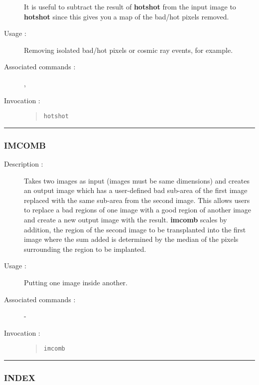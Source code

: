 \begin{description}
\begin{enumerate}
\end{enumerate}

It is useful to subtract the result of {\bf hotshot} from the input
image to {\bf hotshot} since this gives you a map of the bad/hot pixels
removed.

\item[Usage :] Removing isolated bad/hot pixels or cosmic ray events, for
example.

\item[Associated commands :] {\tt {}}, 
{\tt {}}

\item[Invocation :]

\begin{quote}{\tt  hotshot }\end{quote}

\end{description}

\hrule 
\subsubsection*{\label{IMCOMB}IMCOMB}

\begin{description}

\item[Description :] Takes two images as input (images must be same
dimensions) and creates an output image which has a user-defined bad
sub-area of the first image replaced with the same sub-area from the
second image.  This allows users to replace a bad regions of one image
with a good region of another image and create a new output image with
the result.  {\bf imcomb} scales by addition, the region of the second image
to be transplanted into the first image where the sum added is
determined by the median of the pixels surrounding the region to be
implanted.

\item[Usage :] Putting one image inside another.
\item[Associated commands :] -
\item[Invocation :]

\begin{quote}{\tt  imcomb }\end{quote}

\end{description}

\hrule 
\subsubsection*{\label{INDEX}INDEX}

